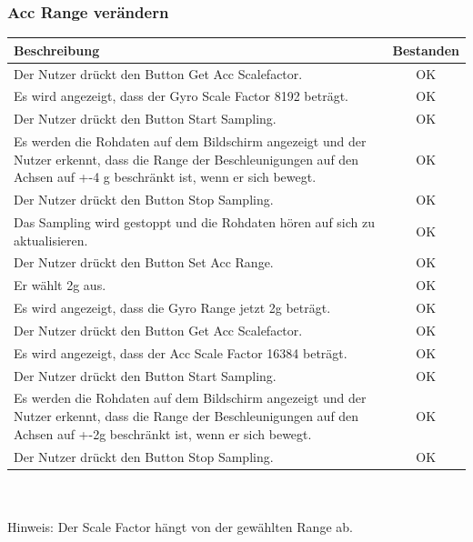 \documentclass[a4paper,12pt]{article}
\newcommand{\testok}[0]{
	\cellcolor{green!25} OK
}
\begin{document}
\subsubsection{Acc Range verändern}
\begin{tabular}{ | p{12cm} | c| }
	\hline
	\textbf{Beschreibung} & \textbf{Bestanden}\\
	\hline
	Der Nutzer drückt den Button \glqq{}Get Acc Scalefactor\grqq{}. & \testok \\
	\hline
	Es wird angezeigt, dass der Gyro Scale Factor 8192 beträgt. & \testok \\
	\hline
	Der Nutzer drückt den Button \glqq{}Start Sampling\grqq{}. & \testok \\
	\hline
	Es werden die Rohdaten auf dem Bildschirm angezeigt und der Nutzer erkennt, dass die Range der Beschleunigungen auf den Achsen  auf +-4 g beschränkt ist, wenn er sich bewegt. & \testok \\
	\hline
	Der Nutzer drückt den Button \glqq{}Stop Sampling\grqq{}. & \testok \\
	\hline
	Das Sampling wird gestoppt und die Rohdaten hören auf sich zu aktualisieren. & \testok \\
	\hline
	Der Nutzer drückt den Button \glqq{}Set Acc Range\grqq{}. & \testok \\
	\hline
	Er wählt 2g aus. & \testok \\
	\hline
	Es wird angezeigt, dass die Gyro Range jetzt 2g beträgt. & \testok \\
	\hline
	Der Nutzer drückt den Button \glqq{}Get Acc Scalefactor\grqq{}. & \testok \\
	\hline
	Es wird angezeigt, dass der Acc Scale Factor 16384 beträgt. & \testok \\
	\hline
	Der Nutzer drückt den Button \glqq{}Start Sampling\grqq{}. & \testok \\
	\hline
	Es werden die Rohdaten auf dem Bildschirm angezeigt und der Nutzer erkennt, dass die Range der Beschleunigungen auf den Achsen  auf +-2g beschränkt ist, wenn er sich bewegt. & \testok \\
	\hline
	Der Nutzer drückt den Button \glqq{}Stop Sampling\grqq{}. & \testok \\
	\hline
\end{tabular}
\\ \\
Hinweis: Der Scale Factor hängt von der gewählten Range ab.
\\ \\ \\ \\
\end{document}
